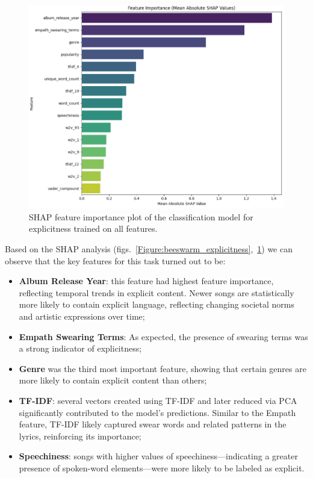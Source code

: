 \begin{center}
\begin{figure}[H]
  \centering
  \includegraphics[width=6in]{img/feature_importance_explicitness.png}
  \caption{SHAP feature importance plot of the classification model for
  explicitness  trained on all features.}
  \label{Figure:feature_importance_explicitness}
\end{figure}
\end{center}


Based on the SHAP analysis
(figs.~\ref{Figure:beeswarm_explicitness},~\ref{Figure:feature_importance_explicitness})
we can observe that the key features for this task turned out to be:
\begin{itemize}
  \item \textbf{Album Release Year}: this feature had  highest feature
    importance, reflecting temporal trends in explicit content. Newer songs are
    statistically more likely to contain explicit language, reflecting changing
    societal norms and artistic expressions over time;
  \item \textbf{Empath Swearing Terms}: As expected, the presence of swearing
    terms was a strong indicator of explicitness;
  \item \textbf{Genre} was the third most important feature, showing that
    certain genres  are more likely to contain explicit content than others;
  \item \textbf{TF-IDF}: several vectors created using TF-IDF and later reduced
    via PCA significantly contributed to the model's predictions. Similar to
    the Empath feature, TF-IDF likely captured swear words and related patterns
    in the lyrics, reinforcing its importance;
  \item \textbf{Speechiness}: songs with higher values of
    speechiness—indicating a greater presence of spoken-word elements—were more
    likely to be labeled as explicit.
\end{itemize}





